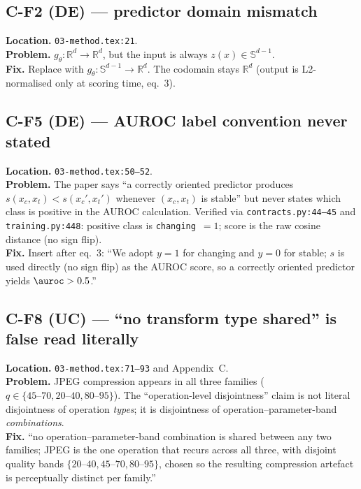 \documentclass[11pt,a4paper]{article}
\begin{document}
\subsection*{C-F2 (DE) --- predictor domain mismatch}

\textbf{Location.} \texttt{03-method.tex:21}.\\
\textbf{Problem.} $g_\theta : \mathbb{R}^d \to \mathbb{R}^d$, but the
input is always $z(x) \in \mathbb{S}^{d-1}$.\\
\textbf{Fix.} Replace with $g_\theta : \mathbb{S}^{d-1} \to \mathbb{R}^d$.
The codomain stays $\mathbb{R}^d$ (output is L2-normalised only at
scoring time, eq.~3).

\subsection*{C-F5 (DE) --- AUROC label convention never stated}

\textbf{Location.} \texttt{03-method.tex:50--52}.\\
\textbf{Problem.} The paper says ``a correctly oriented predictor
produces $s(x_c, x_t) < s(x_c', x_t')$ whenever $(x_c, x_t)$ is
stable'' but never states which class is positive in the AUROC
calculation. Verified via \texttt{contracts.py:44--45} and
\texttt{training.py:448}: positive class is \texttt{changing}~$=1$;
score is the raw cosine distance (no sign flip).\\
\textbf{Fix.} Insert after eq.~3: ``We adopt $y = 1$ for changing and
$y = 0$ for stable; $s$ is used directly (no sign flip) as the AUROC
score, so a correctly oriented predictor yields $\auroc > 0.5$.''

\subsection*{C-F8 (UC) --- ``no transform type shared'' is false read
            literally}

\textbf{Location.} \texttt{03-method.tex:71--93} and Appendix~C.\\
\textbf{Problem.} JPEG compression appears in all three families
($q \in \{45\text{--}70, 20\text{--}40, 80\text{--}95\}$). The
``operation-level disjointness'' claim is not literal disjointness of
operation \emph{types}; it is disjointness of operation--parameter-band
\emph{combinations}.\\
\textbf{Fix.} ``no operation--parameter-band combination is shared
between any two families; JPEG is the one operation that recurs across
all three, with disjoint quality bands $\{20\text{--}40,
45\text{--}70, 80\text{--}95\}$, chosen so the resulting compression
artefact is perceptually distinct per family.''
\end{document}
